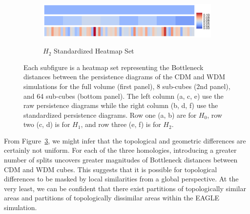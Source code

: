 \documentclass[12pt]{article}
\newcommand{\figref}[1]{Figure~\ref{#1}}
\begin{document}
\begin{figure}[htp!]
\begin{subfigure}{.45\textwidth}
    \label{fig:cubeHeatmap2}
  \end{subfigure}
  \begin{subfigure}{.45\textwidth}
    \centering
    \caption{$H_2$ Standardized Heatmap Set}
    \includegraphics[width=\linewidth]{fig_12_hmap_dim2_yesnorm.pdf}
    \label{fig:cubeHeatmapStand2}
  \end{subfigure}
  \caption{Each subfigure is a heatmap set representing the Bottleneck distances between the persistence diagrams of the CDM and WDM simulations for the full volume (first panel), 8 sub-cubes (2nd panel), and 64 sub-cubes (bottom panel).  The left column (a, c, e) use the raw persistence diagrams while the right column (b, d, f) use the standardized persistence diagrams.  Row one (a, b) are for $H_0$, row two (c, d) is for $H_1$, and row three (e, f) is for $H_2$.
}
  \label{fig:cubeHeatmap}
\end{figure}

From \figref{fig:cubeHeatmap}, we might infer that the topological and geometric differences are certainly not uniform. For each of the three homologies, introducing a greater number of splits uncovers greater magnitudes of Bottleneck distances between CDM and WDM cubes. This suggests that it is possible for topological differences to be masked by local similarities from a global perspective. At the very least, we can be confident that there exist partitions of topologically similar areas and partitions of topologically dissimilar areas within the EAGLE simulation. 
\end{document}
